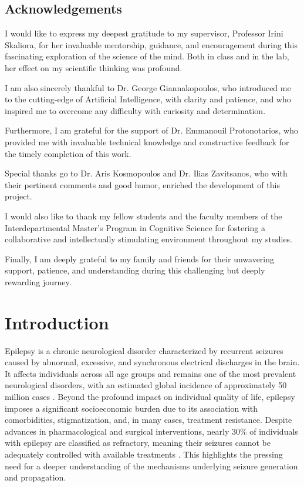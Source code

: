 \documentclass{article}
\begin{document}
\begin{center}
	\section*{Acknowledgements}
\end{center}

I would like to express my deepest gratitude to my supervisor, Professor Irini Skaliora, for her invaluable mentorship, guidance, and encouragement during this fascinating exploration of the science of the mind. Both in class and in the lab, her effect on my scientific thinking was profound.

I am also sincerely thankful to Dr. George Giannakopoulos, who introduced me to the cutting-edge of Artificial Intelligence, with clarity and patience, and who inspired me to overcome any difficulty with curiosity and determination. 

Furthermore, I am grateful for the support of Dr. Emmanouil Protonotarios, who provided me with invaluable technical knowledge and constructive feedback for the timely completion of this work.

Special thanks go to Dr. Aris Kosmopoulos and Dr. Ilias Zavitsanos, who with their pertinent comments and good humor, enriched the development of this project.

I would also like to thank my fellow students and the faculty members of the Interdepartmental Master's Program in Cognitive Science for fostering a collaborative and intellectually stimulating environment throughout my studies.

Finally, I am deeply grateful to my family and friends for their unwavering support, patience, and understanding during this challenging but deeply rewarding journey.

\newpage
\thispagestyle{empty}
\tableofcontents
\newpage

\newpage
\thispagestyle{empty}
\listoffigures
\newpage

\section{Introduction}
Epilepsy is a chronic neurological disorder characterized by recurrent seizures caused by abnormal, excessive, and synchronous electrical discharges in the brain. It affects individuals across all age groups and remains one of the most prevalent neurological disorders, with an estimated global incidence of approximately 50 million cases \cite{who2019}. Beyond the profound impact on individual quality of life, epilepsy imposes a significant socioeconomic burden due to its association with comorbidities, stigmatization, and, in many cases, treatment resistance. Despite advances in pharmacological and surgical interventions, nearly 30\% of individuals with epilepsy are classified as refractory, meaning their seizures cannot be adequately controlled with available treatments \cite{janson2020}. This highlights the pressing need for a deeper understanding of the mechanisms underlying seizure generation and propagation.
\end{document}
